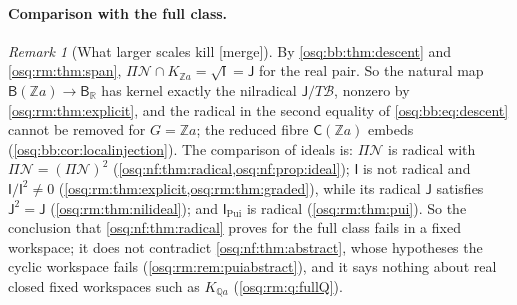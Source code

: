 \documentclass[11pt,letterpaper]{article}
\numberwithin{equation}{section}
\theoremstyle{definition}
\theoremstyle{remark}
\newtheorem{remark}[remark]{Remark}
\theoremstyle{plain}
\newcommand{\Z}{\mathbb Z}
\newcommand{\Q}{\mathbb Q}
\newcommand{\R}{\mathbb R}
\newcommand{\NN}{\mathcal N}         %
\newcommand{\merge}{\textup{\textsf{[merge]}}}
\begin{document}
\paragraph{Comparison with the full class.}

\begin{remark}[What larger scales kill \merge]\label{osq:rm:rem:fullclass}
By \cref{osq:bb:thm:descent} and \cref{osq:rm:thm:span}, $\Pi\NN\cap K_{\Z a}=\sqrt{\mathsf I}=\mathsf J$ for the real pair. So the natural map
$\mathsf B(\Z a)\to\mathsf B_\R$ has kernel exactly the nilradical $\mathsf J/T\mathscr B$, nonzero by \cref{osq:rm:thm:explicit}, and the radical in the second
equality of \eqref{osq:bb:eq:descent} cannot be removed for $G=\Z a$; the reduced fibre $\mathsf C(\Z a)$ embeds (\cref{osq:bb:cor:localinjection}). The
comparison of ideals is: $\Pi\NN$ is radical with $\Pi\NN=(\Pi\NN)^2$ (\cref{osq:nf:thm:radical,osq:nf:prop:ideal}); $\mathsf I$ is not radical and
$\mathsf I/\mathsf I^2\ne0$ (\cref{osq:rm:thm:explicit,osq:rm:thm:graded}), while its radical $\mathsf J$ satisfies $\mathsf J^2=\mathsf J$ (\cref{osq:rm:thm:nilideal});
and $\mathsf I_{\mathrm{Pui}}$ is radical (\cref{osq:rm:thm:pui}). So the conclusion that \cref{osq:nf:thm:radical} proves for the full class fails in a fixed
workspace; it does not contradict \cref{osq:nf:thm:abstract}, whose hypotheses the cyclic workspace fails (\cref{osq:rm:rem:puiabstract}), and it says
nothing about real closed fixed workspaces such as $K_{\Q a}$ (\cref{osq:rm:q:fullQ}).
\end{remark}
\end{document}
